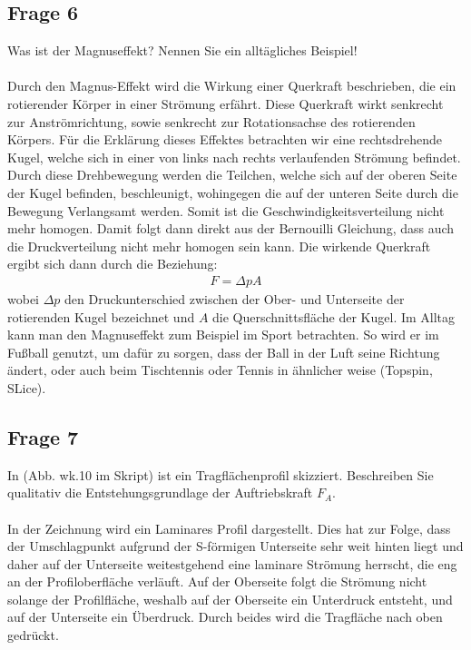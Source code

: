 \documentclass[a4paper,10pt]{scrartcl}
\begin{document}
		\subsection{Frage 6}
			Was ist der Magnuseffekt? Nennen Sie ein alltägliches Beispiel!\\
			\\
			Durch den Magnus-Effekt wird die Wirkung einer Querkraft beschrieben, die ein rotierender Körper in einer Strömung erfährt. Diese Querkraft wirkt senkrecht zur Anströmrichtung, sowie senkrecht zur Rotationsachse des rotierenden Körpers. Für die Erklärung dieses Effektes betrachten wir eine rechtsdrehende Kugel, welche sich in einer von links nach rechts verlaufenden Strömung befindet. Durch diese Drehbewegung werden die Teilchen, welche sich auf der oberen Seite der Kugel befinden, beschleunigt, wohingegen die auf der unteren Seite durch die Bewegung Verlangsamt werden. Somit ist die Geschwindigkeitsverteilung nicht mehr homogen. Damit folgt dann direkt aus der Bernouilli Gleichung, dass auch die Druckverteilung nicht mehr homogen sein kann. Die wirkende Querkraft ergibt sich dann durch die Beziehung:
			\begin{align*}
			F=\Delta p A
			\end{align*}
			wobei \(\Delta p\) den Druckunterschied zwischen der Ober- und Unterseite der rotierenden Kugel bezeichnet und \(A\) die Querschnittsfläche der Kugel. Im Alltag kann man den Magnuseffekt zum Beispiel im Sport betrachten. So wird er im Fußball genutzt, um dafür zu sorgen, dass der Ball in der Luft seine Richtung ändert, oder auch beim Tischtennis oder Tennis in ähnlicher weise (Topspin, SLice).
			
		\subsection{Frage 7}
			In (Abb. wk.10 im Skript) ist ein Tragflächenprofil skizziert. Beschreiben Sie qualitativ die Entstehungsgrundlage
			der Auftriebskraft \(F_{A}\).\\
			\\
			In der Zeichnung wird ein Laminares Profil dargestellt. Dies hat zur Folge, dass der Umschlagpunkt aufgrund der S-förmigen Unterseite sehr weit hinten liegt und daher auf der Unterseite weitestgehend eine laminare Strömung herrscht, die eng an der Profiloberfläche verläuft. Auf der Oberseite folgt die Strömung nicht solange der Profilfläche, weshalb auf der Oberseite ein Unterdruck entsteht, und auf der Unterseite ein Überdruck. Durch beides wird die Tragfläche nach oben gedrückt.
		
	
\end{document}
